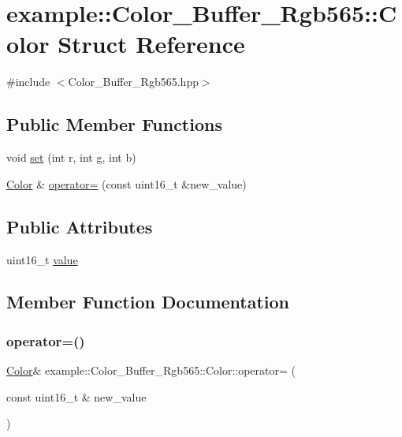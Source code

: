 \hypertarget{structexample_1_1_color___buffer___rgb565_1_1_color}{}\section{example\+::Color\+\_\+\+Buffer\+\_\+\+Rgb565\+::Color Struct Reference}
\label{structexample_1_1_color___buffer___rgb565_1_1_color}


{\ttfamily \#include $<$Color\+\_\+\+Buffer\+\_\+\+Rgb565.\+hpp$>$}

\subsection*{Public Member Functions}
\begin{DoxyCompactItemize}
\item 
void \mbox{\hyperlink{structexample_1_1_color___buffer___rgb565_1_1_color_a78ef03cc7c363dd9ab41add324d0054c}{set}} (int r, int g, int b)
\item 
\mbox{\hyperlink{structexample_1_1_color___buffer___rgb565_1_1_color}{Color}} \& \mbox{\hyperlink{structexample_1_1_color___buffer___rgb565_1_1_color_addfdba59f7668f2b49a5124dddadc4a4}{operator=}} (const uint16\+\_\+t \&new\+\_\+value)
\end{DoxyCompactItemize}
\subsection*{Public Attributes}
\begin{DoxyCompactItemize}
\item 
uint16\+\_\+t \mbox{\hyperlink{structexample_1_1_color___buffer___rgb565_1_1_color_adca47da57dc30002d9f8f40f292a7fae}{value}}
\end{DoxyCompactItemize}


\subsection{Member Function Documentation}
\mbox{\label{structexample_1_1_color___buffer___rgb565_1_1_color_addfdba59f7668f2b49a5124dddadc4a4}} 
\subsubsection{\texorpdfstring{operator=()}{operator=()}}
{\footnotesize\ttfamily \mbox{\hyperlink{structexample_1_1_color___buffer___rgb565_1_1_color}{Color}}\& example\+::\+Color\+\_\+\+Buffer\+\_\+\+Rgb565\+::\+Color\+::operator= (\begin{DoxyParamCaption}\item[{const uint16\+\_\+t \&}]{new\+\_\+value }\end{DoxyParamCaption})\hspace{0.3cm}{\ttfamily [inline]}}

